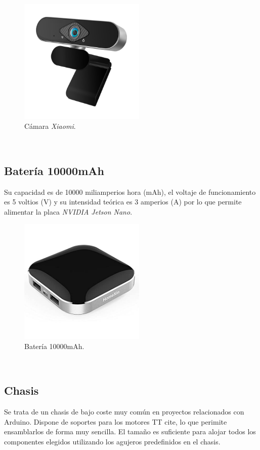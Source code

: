 \begin{figure} [h!]
	\begin{center}
		\includegraphics[width=6cm]{figs/camera}
	\end{center}
	\caption{Cámara \textit{Xiaomi}.}
	\label{fig:camera}
\end{figure}\

\subsection{Batería 10000mAh}
Su capacidad es de 10000 miliamperios hora (mAh), el voltaje de funcionamiento es 5 voltios (V) y su intensidad teórica es 3 amperios (A) por lo que permite alimentar la placa \textit{NVIDIA Jetson Nano}.\\


\begin{figure} [h!]
	\begin{center}
		\includegraphics[width=6cm]{figs/battery}
	\end{center}
	\caption{Batería 10000mAh.}
	\label{fig:battery}
\end{figure}\

\subsection{Chasis}
Se trata de un chasis de bajo coste muy común en proyectos relacionados con Arduino. Dispone de soportes para los motores TT cite, lo que perimite ensamblarlos de forma muy sencilla. El tamaño es suficiente para alojar todos los componentes elegidos utilizando los agujeros predefinidos en el chasis.\\

